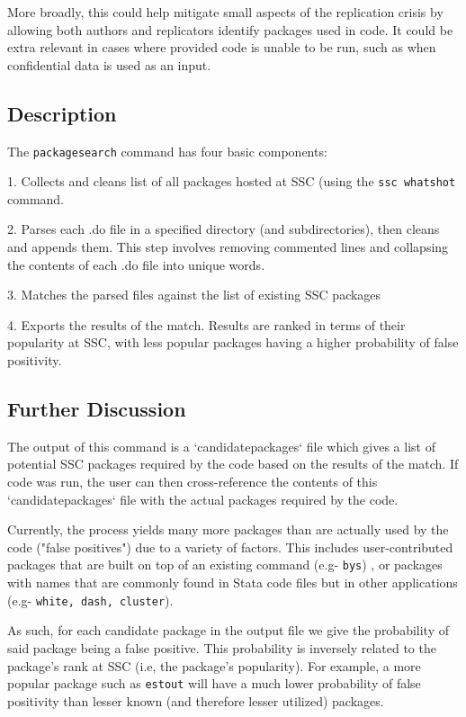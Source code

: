 More broadly, this could help mitigate small aspects of the replication crisis by allowing both authors and replicators identify packages used in code. It could be extra relevant in cases where provided code is unable to be run, such as when confidential data is used as an input. 


\subsection{Description}

The \texttt{packagesearch} command has four basic components:

1. Collects and cleans list of all packages hosted at SSC (using the \texttt{ssc whatshot} command. 

2. Parses each .do file in a specified directory (and subdirectories), then cleans and appends them. This step involves removing commented lines and collapsing the contents of each .do file into unique words.

3. Matches the parsed files against the list of existing SSC packages

4. Exports the results of the match. Results are ranked in terms of their popularity at SSC, with less popular packages having a higher probability of false positivity.

\subsection{Further Discussion}

The output of this command is a `candidatepackages` file which gives a list of potential SSC packages required by the code based on the results of the match. If code was run, the user can then cross-reference the contents of this `candidatepackages` file with the actual packages required by the code.

Currently, the process yields many more packages than are actually used by the code ("false positives") due to a variety of factors. This includes user-contributed packages that are built on top of an existing command (e.g- \texttt{bys}) , or packages with names that are commonly found in Stata code files but in other applications (e.g- \texttt{white, dash, cluster}). 

As such, for each candidate package in the output file we give the probability of said package being a false positive. This probability is inversely related to the package's rank at SSC (i.e, the package's popularity). For example, a more popular package such as \texttt{estout} will have a much lower probability of false positivity than lesser known (and therefore lesser utilized) packages.


